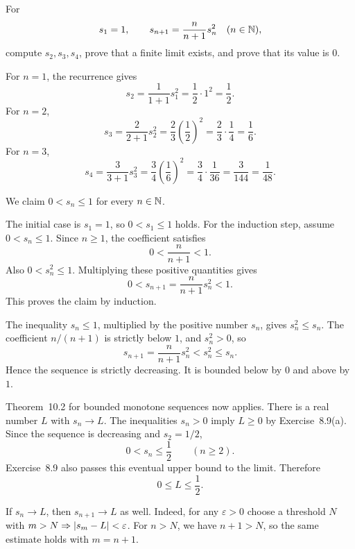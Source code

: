 
\goal For
\[
 s_1=1,\qquad s_{n+1}=\frac{n}{n+1}s_n^2\quad(n\in\mathbb{N}),
\]
compute $s_2,s_3,s_4$, prove that a finite limit exists, and prove
that its value is $0$.

For $n=1$, the recurrence gives
\[
 s_2=\frac1{1+1}s_1^2=\frac12\cdot1^2=\frac12.
\]
For $n=2$,
\[
 s_3=\frac2{2+1}s_2^2
     =\frac23\left(\frac12\right)^2
     =\frac23\cdot\frac14=\frac16.
\]
For $n=3$,
\[
 s_4=\frac3{3+1}s_3^2
     =\frac34\left(\frac16\right)^2
     =\frac34\cdot\frac1{36}
     =\frac3{144}=\frac1{48}.
\]


We claim $0<s_n\le1$ for every $n\in\mathbb{N}$.

The initial case is $s_1=1$, so $0<s_1\le1$ holds.
For the induction step, assume $0<s_n\le1$.
Since $n\ge1$, the coefficient satisfies
\[
 0<\frac n{n+1}<1.
\]
Also $0<s_n^2\le1$.
Multiplying these positive quantities gives
\[
 0<s_{n+1}=\frac n{n+1}s_n^2<1.
\]
This proves the claim by induction.

The inequality $s_n\le1$, multiplied by the positive number $s_n$,
gives $s_n^2\le s_n$. The coefficient $n/(n+1)$ is strictly below $1$,
and $s_n^2>0$, so
\[
 s_{n+1}=\frac n{n+1}s_n^2<s_n^2\le s_n.
\]
Hence the sequence is strictly decreasing. It is bounded below by $0$
and above by $1$.

Theorem~10.2 for bounded monotone sequences now applies.
There is a real number $L$ with $s_n\to L$.
The inequalities $s_n>0$ imply $L\ge0$ by Exercise~8.9(a).
Since the sequence is decreasing and $s_2=1/2$,
\[
 0<s_n\le\frac12\qquad(n\ge2).
\]
Exercise~8.9 also passes this eventual upper bound to the limit.
Therefore
\[
 0\le L\le\frac12.
\]


If $s_n\to L$, then $s_{n+1}\to L$ as well.
Indeed, for any $\varepsilon>0$ choose a threshold $N$ with
$m>N\Rightarrow\left|s_m-L\right|<\varepsilon$.
For $n>N$, we have $n+1>N$, so the same estimate holds with $m=n+1$.

